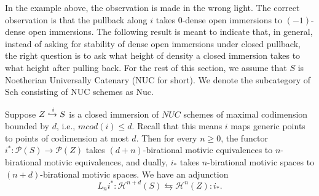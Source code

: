 In the example above, the observation is made in the wrong light. The correct observation is that the pullback along $i$ takes $0$-dense open immersions to $(-1)$-dense open immersions. The following result is meant to indicate that, in general, instead of asking for stability of dense open immersions under closed pullback, the right question is to ask what height of density a closed immersion takes to what height after pulling back. For the rest of this section, we assume that $S$ is Noetherian Universally Catenary (NUC for short). We denote the subcategory of $\mathrm{Sch}$ consisting of NUC schemes as $\mathrm{Nuc}$. 
  \begin{thm}\label{closed rel d push}
Suppose $Z\xhookrightarrow{i} S$ is a closed immersion of $NUC$ schemes of maximal codimension bounded by $d$, i.e., $mcod(i)\leq d$. Recall that this means $i$ maps generic points to points of codimension at most $d$. Then for every $n\geq 0$, the functor $i^*:\mathcal{P}(S)\to \mathcal{P}(Z)$ takes $(d+n)$-birational motivic equivalences to $n$-birational motivic equivalences, and dually, $i_*$ takes $n$-birational motivic spaces to $(n+d)$-birational motivic spaces. We have an adjunction $$L_{n}i^*: \mathcal{H}^{{n+d}}(S) \leftrightarrows \mathcal{H}^{n}(Z):i_{*}.$$
    \end{thm}
